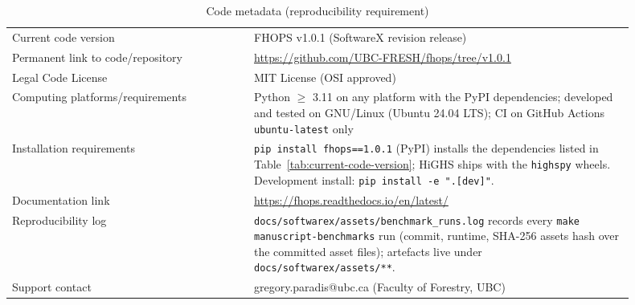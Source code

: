 \begin{table}[ht]
  \centering
  \caption{Code metadata (reproducibility requirement)}
  \label{tab:code-metadata}
  \begin{tabular}{p{0.35\linewidth}p{0.55\linewidth}}
    \hline
    Current code version & FHOPS v1.0.1 (SoftwareX revision release) \\
    Permanent link to code/repository & \url{https://github.com/UBC-FRESH/fhops/tree/v1.0.1} \\
    Legal Code License & MIT License (OSI approved) \\
    Computing platforms/requirements & Python $\geq$ 3.11 on any platform with the PyPI dependencies; developed and tested on GNU/Linux (Ubuntu 24.04 LTS); CI on GitHub Actions \texttt{ubuntu-latest} only \\
    Installation requirements & \texttt{pip install fhops==1.0.1} (PyPI) installs the dependencies listed in Table~\ref{tab:current-code-version}; HiGHS ships with the \texttt{highspy} wheels. Development install: \texttt{pip install -e ".[dev]"}. \\
    Documentation link & \url{https://fhops.readthedocs.io/en/latest/} \\
    Reproducibility log & \texttt{docs/softwarex/assets/benchmark\_runs.log} records every \texttt{make manuscript-benchmarks} run (commit, runtime, SHA-256 assets hash over the committed asset files); artefacts live under \texttt{docs/softwarex/assets/**}. \\
    Support contact & gregory.paradis@ubc.ca (Faculty of Forestry, UBC) \\
    \hline
  \end{tabular}
\end{table}
